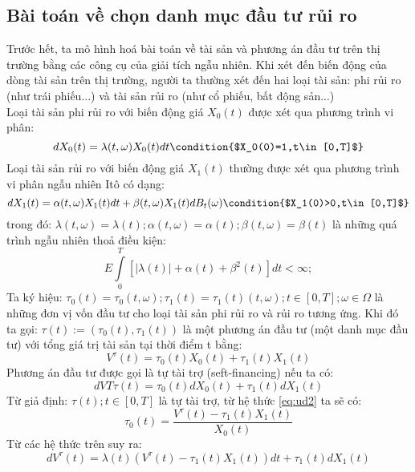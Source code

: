 \documentclass[a4paper]{article}
\numberwithin{equation}{section}
\begin{document}
\subsection{Bài toán về chọn danh mục đầu tư rủi ro}
Trước hết, ta mô hình hoá bài toán về tài sản và phương án đầu tư trên thị trường bằng các công cụ của giải tích ngẫu nhiên. Khi xét đến biến động của dòng tài sản trên thị trường, người ta thường xét đến hai loại tài sản: phi rủi ro (như trái phiếu...) và tài sản rủi ro (như cổ phiếu, bất động sản...)\\
Loại tài sản phi rủi ro với biến động giá $X_0(t)$ được xét qua phương trình vi phân:
\begin{equation*}
	dX_0(t)=\lambda(t,\omega)X_0(t)dt \condition{$X_0(0)=1,t\in[0,T]$}
\end{equation*}
Loại tài sản rủi ro với biến động giá $X_1(t)$ thường được xét qua phương trình vi phân ngẫu nhiên Itô có dạng:
\begin{equation}\label{eq:ud1}
	dX_1(t)=\alpha(t,\omega)X_1(t)dt+\beta(t,\omega)X_1(t)dB_t(\omega) \condition{$X_1(0)>0,t\in[0,T]$}
\end{equation}
trong đó: $\lambda(t,\omega)=\lambda(t);\alpha(t,\omega)=\alpha(t);\beta(t,\omega)=\beta(t)$ là những quá trình ngẫu nhiên thoả điều kiện:
\begin{equation*}
	E\int\limits_{0}^{T}[|\lambda(t)|+\alpha(t)+\beta^2(t)]dt<\infty;
\end{equation*}
Ta ký hiệu: $\tau_0(t)=\tau_0(t,\omega);\tau_1(t)=\tau_1(t)(t,\omega);t\in[0,T];\omega\in \Omega$ là những đơn vị vốn đầu tư cho loại tài sản phi rủi ro và rủi ro tương ứng. Khi đó ta gọi: $\tau(t):=(\tau_0(t),\tau_1(t))$ là một phương án đầu tư (một danh mục đầu tư) với tổng giá trị tài sản tại thời điểm t bằng:
\begin{equation}\label{eq:ud2}
	V^\tau(t)=\tau_0(t)X_0(t)+\tau_1(t)X_1(t)	
\end{equation}
Phương án đầu tư được gọi là tự tài trợ (seft-financing) nếu ta có:
\begin{equation}\label{eq:ud3}
	dVT\tau(t)=\tau_0(t)dX_0(t)+\tau_1(t)dX_1(t)
\end{equation}
Từ giả định: $\tau(t);t\in[0,T]$ là tự tài trợ, từ hệ thức \eqref{eq:ud2} ta sẽ có:
\begin{equation*}
	\tau_0(t)=\dfrac{V^\tau(t)-\tau_1(t)X_1(t)}{X_0(t)}
\end{equation*}
Từ các hệ thức trên suy ra:
\begin{equation*}
	dV^\tau(t)=\lambda(t)(V^\tau(t)-\tau_1(t)X_1(t))dt+\tau_1(t)dX_1(t)
\end{equation*}
\end{document}
